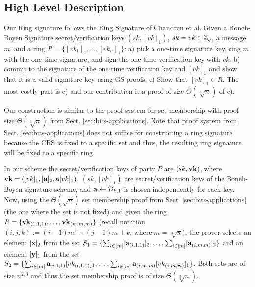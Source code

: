 \subsection{High Level Description}

Our Ring signature follows the Ring Signature of Chandran et al. Given a Boneh-Boyen Signature secret/verification keys $(sk,[vk]_1)$, $sk=vk\in\mathbb{Z}_q$, a message $m$, and a ring $R=\{[vk_1]_1,\ldots,[vk_n]_1\}$: a) pick a one-time signature key, sing $m$ with the one-time signature, and sign the one time verification key with $vk$; b) commit to the signature of the one time verification key and $[vk]_1$ and show that it is a valid signature key using GS proofs; c) Show that $[vk]_1\in R$. The most costly part is c) and our contribution is a proof of size $\Theta(\sqrt[3]{n})$ of c).

Our construction is similar to the proof system for set membership with proof size $\Theta(\sqrt[3]{n})$ from Sect. \ref{sec:bits-applications}. Note that proof system from Sect. \ref{sec:bits-applications} does not suffice for constructing a ring signature because the CRS is fixed to a specific set and thus, the resulting ring signature will be fixed to a specific ring. 



In our scheme the secret/verification keys of party $P$ are $(sk,\mathbf{vk})$, where $\mathbf{vk}=([vk]_1,[\mathbf{a}]_2,\mathbf{a}[vk]_1)$, $(sk,[vk]_1)$ are secret/verification keys of the Boneh-Boyen signature scheme, and $\mathbf{a}\gets\mathcal{D}_{k,1}$ is chosen independently for each key. Now, using the $\Theta(\sqrt{n})$ set membership proof from Sect. \ref{sec:bits-applications} (the one where the set is not fixed) and given the ring $R=\{\mathbf{vk}_{(1,1,1)},\ldots,\mathbf{vk}_{(m,m,m)}\}$ (recall notation $(i,j,k):=(i-1)m^2+(j-1)m+k$, where $m=\sqrt[3]{n}$), the prover selects an element $[\mathbf{x}]_2$ from the set $S_1=\{\sum_{i\in[m]}[\mathbf{a}_{(i,1,1)}]_2,\ldots,\sum_{i\in[m]}[\mathbf{a}_{(i,m,m)}]_2\}$ and an element $[\mathbf{y}]_1$ from the set $S_2=\{\sum_{i\in[m]}\mathbf{a}_{(i,1,1)}[vk_{(i,1,1)}]_1,\ldots,\sum_{i\in[m]}\mathbf{a}_{(i,m,m)}[vk_{(i,m,m)}]_1\}$. Both sets are of size $n^{2/3}$ and thus the set membership proof is of size $\Theta(\sqrt[3]{n})$.

